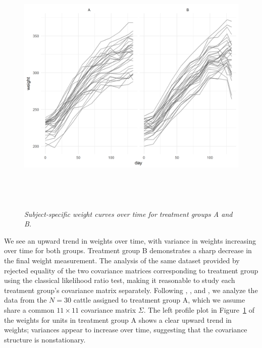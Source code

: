 \begin{center}  
\begin{figure}[H] 
\begin{center}
\includegraphics[width = .9\textwidth, height = 5in]{img/cattle/cattle-weights-vs-time-by-trt}
\caption{\textit{Subject-specific weight curves over time for treatment groups A and B.}}\label{fig:cattle-weights-by-trt}
\end{center}
\end{figure} 
\end{center}

We see an upward trend in weights over time, with variance in weights increasing over time for both groups. Treatment group B demonstrates a sharp decrease in the final weight measurement. The analysis of the same dataset provided by \cite{zimmerman1997structured} rejected equality of the two covariance matrices corresponding to treatment group using the classical likelihood ratio test, making it reasonable to study each treatment group's covariance matrix separately. Following \cite{pan2017jmcm}, \cite{zhang2015joint}, and \cite{pourahmadi1999joint}, we analyze the data from the $N = 30$ cattle assigned to treatment group A, which we assume share a common $11 \times 11$ covariance matrix $\Sigma$. The left profile plot in Figure~\ref{fig:cattle-weights-by-trt} of the weights for units in treatment group A shows a clear upward trend in weights;  variances appear to increase over time, suggesting that the covariance structure is nonstationary.

